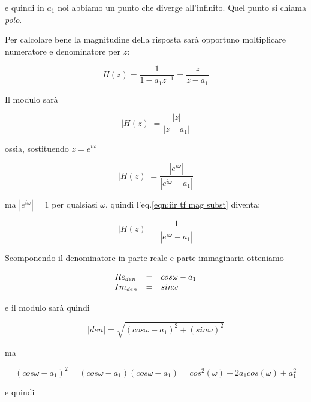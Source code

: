 e quindi in $a_1$ noi abbiamo un punto che diverge all'infinito. Quel punto si
chiama \emph{polo}.

Per calcolare bene la magnitudine della risposta sar\`a opportuno moltiplicare
numeratore e denominatore per $z$:

	\begin{equation}
		H(z) = \frac{1}{1 - a_1 z^{-1}} = \frac{z}{z - a_1}
	\end{equation}

Il modulo sar\`a

	\begin{equation}
		|H(z)| = \frac{|z|}{|z - a_1|}
	\end{equation}

	oss\`ia, sostituendo $z = e^{i\omega}$

	\begin{equation}\label{eqn:iir tf mag subst}
		|H(z)| = \frac{|e^{i\omega}|}{|e^{i\omega} - a_1|}
	\end{equation}

ma $|e^{i\omega}| = 1$ per qualsiasi $\omega$, quindi l'eq.\ref{eqn:iir tf mag subst}
diventa:

	\begin{equation}\label{eqn:iir tf mag subst no num}
		|H(z)| = \frac{1}{|e^{i\omega} - a_1|}
	\end{equation}

Scomponendo il denominatore in parte reale e parte immaginaria otteniamo

	\begin{equation}
		\begin{array}{l c l}
			Re_{den} & = & cos \omega - a_1\\
			Im_{den} & = & sin \omega\\
		\end{array}
	\end{equation}

e il modulo sar\`a quindi

	\begin{equation}
		|den| = \sqrt{( cos \omega - a_1 )^2 + ( sin \omega )^2}
	\end{equation}

ma

	\begin{equation}
		( cos \omega - a_1 )^2 = ( cos \omega - a_1 ) ( cos \omega - a_1 ) = cos^2 ( \omega ) - 2 a_1 cos ( \omega ) + a_1^2
	\end{equation}

e quindi

